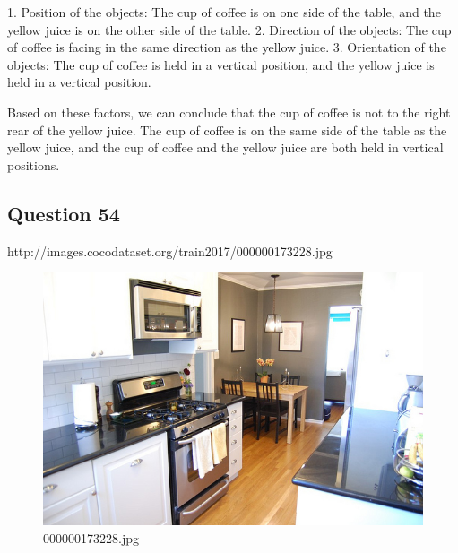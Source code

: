 \begin{enumerate}
    1. Position of the objects: The cup of coffee is on one side of the table, and the yellow juice is on the other side of the table.
    2. Direction of the objects: The cup of coffee is facing in the same direction as the yellow juice.
    3. Orientation of the objects: The cup of coffee is held in a vertical position, and the yellow juice is held in a vertical position.
    
    Based on these factors, we can conclude that the cup of coffee is not to the right rear of the yellow juice. The cup of coffee is on the same side of the table as the yellow juice, and the cup of coffee and the yellow juice are both held in vertical positions.
\end{enumerate}
\subsection*{Question 54}
http://images.cocodataset.org/train2017/000000173228.jpg
\begin{figure}[h]
    \centering
    \includegraphics[width=0.8\linewidth]{../image set/hard/000000173228.jpg}
    \caption{000000173228.jpg}
\end{figure}
